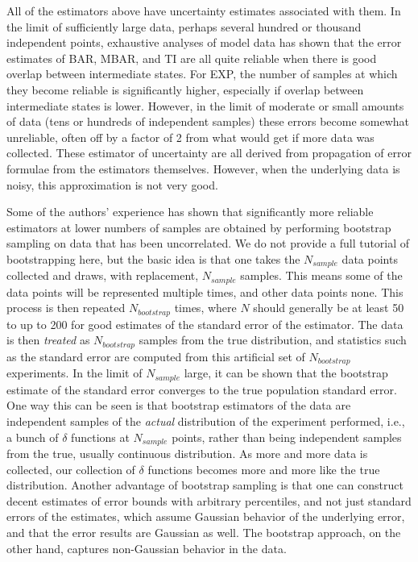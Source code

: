 \documentclass[9pt,bestpractices]{livecoms}
\begin{document}
All of the estimators above have uncertainty estimates associated with them.  In the limit of sufficiently large data, perhaps several hundred or thousand independent points, exhaustive analyses of model data has shown that the error estimates of BAR, MBAR, and TI are all quite reliable when there is good overlap between intermediate states. For EXP, the number of samples at which they become reliable is significantly higher, especially if overlap between intermediate states is lower. However, in the limit of moderate or small amounts of data (tens or hundreds of independent samples) these errors become somewhat unreliable, often off by a factor of 2 from what would get if more data was collected. These estimator of uncertainty are all derived from propagation of error formulae from the estimators themselves. However, when the underlying data is noisy, this approximation is not very good.

Some of the authors' experience has shown that significantly more reliable estimators at lower numbers of samples are obtained by performing bootstrap sampling on data that has been uncorrelated. We do not provide a full tutorial of bootstrapping here, but the basic idea is that one takes the $N_{sample}$ data points collected and draws, with replacement, $N_{sample}$ samples.  This means some of the data points will be represented multiple times, and other data points none. This process is then repeated $N_{bootstrap}$ times, where $N$ should generally be at least 50 to up to 200 for good estimates of the standard error of the estimator.  The data is then \textit{treated} as $N_{bootstrap}$ samples from the true distribution, and statistics such as the standard error are computed from this artificial set of $N_{bootstrap}$ experiments.  In the limit of $N_{sample}$ large, it can be shown that the bootstrap estimate of the standard error converges to the true population standard error.  One way this can be seen is that bootstrap estimators of the data are independent samples of the \textit{actual} distribution of the experiment performed, i.e., a bunch of $\delta$ functions at $N_{sample}$ points, rather than being independent samples from the true, usually continuous distribution.  As more and more data is collected, our collection of $\delta$ functions becomes more and more like the true distribution. Another advantage of bootstrap sampling is that one can construct decent estimates of error bounds with arbitrary percentiles, and not just standard errors of the estimates, which assume Gaussian behavior of the underlying error, and that the error results are Gaussian as well.  The bootstrap approach, on the other hand, captures non-Gaussian behavior in the data. 
\end{document}
